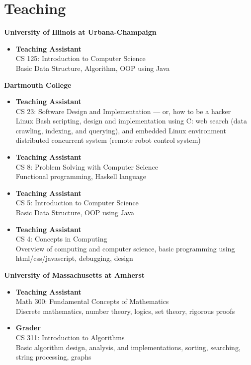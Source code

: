 \section{\sc Teaching}

{\bf University of Illinois at Urbana-Champaign}
\begin{itemize}
\item {\bf Teaching Assistant} \\ CS 125: Introduction to Computer
  Science \\ Basic Data Structure, Algorithm, OOP using Java
\end{itemize}

{\bf Dartmouth College}
\begin{itemize}
\item {\bf Teaching Assistant} \\ CS 23: Software Design and
  Implementation --– or, how to be a hacker \\ Linux Bash scripting,
  design and implementation using C: web search (data crawling,
  indexing, and querying), and embedded Linux environment distributed
  concurrent system (remote robot control system)
\item {\bf Teaching Assistant} \\ CS 8: Problem Solving with Computer
  Science \\ Functional programming, Haskell language
\item {\bf Teaching Assistant} \\ CS 5: Introduction to Computer
  Science \\ Basic Data Structure, OOP using Java
\item {\bf Teaching Assistant} \\ CS 4: Concepts in Computing
  \\ Overview of computing and computer science, basic programming
  using html/css/javascript, debugging, design
\end{itemize}

{\bf University of Massachusetts at Amherst}
\begin{itemize}
\item {\bf Teaching Assistant} \\ Math 300: Fundamental Concepts of
  Mathematics \\ Discrete mathematics, number theory, logics, set
  theory, rigorous proofs
\item {\bf Grader} \\ CS 311: Introduction to Algorithms \\ Basic
  algorithm design, analysis, and implementations, sorting, searching,
  string processing, graphs
\end{itemize}
